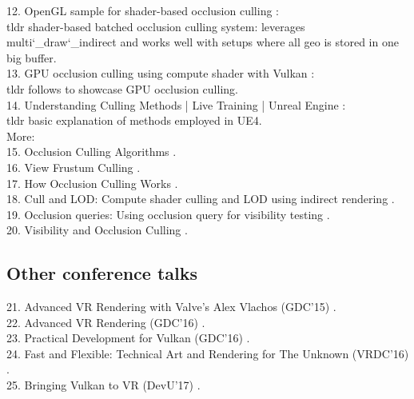 12. OpenGL sample for shader-based occlusion culling \cite{Kubisch.2014}: \\
tldr shader-based batched occlusion culling system: leverages multi\char`_draw\char`_indirect and works well with setups where all geo is stored in one big buffer.\\

13. GPU occlusion culling using compute shader with Vulkan \cite{sydneyzh.2018}: \\
tldr follows \cite{Anagnostou.2017} to showcase GPU occlusion culling.\\

14. Understanding Culling Methods | Live Training | Unreal Engine \cite{Hobson.2019}: \\
tldr basic explanation of methods employed in UE4.\\

More:\\
15. Occlusion Culling Algorithms \cite{Haines.1999}. \\
16. View Frustum Culling \cite{Lighthouse3d.com.2011}.\\
17. How Occlusion Culling Works \cite{thebennybox.2018}.\\
18. Cull and LOD: Compute shader culling and LOD using indirect rendering \cite{Willems.2016.6}.\\
19. Occlusion queries: Using occlusion query for visibility testing \cite{Willems.2016.4}.\\
20. Visibility and Occlusion Culling \cite{EpicGamesInc..n.d.}.\\

\subsection{Other conference talks}
21. Advanced \gls{VR} Rendering with Valve's Alex Vlachos (GDC'15) \cite{Vlachos.2016}.\\
22. Advanced \gls{VR} Rendering (GDC'16) \cite{Vlachos.2016b}.\\
23. Practical Development for Vulkan (GDC'16) \cite{Ginsburg.2016}.\\
24. Fast and Flexible: Technical Art and Rendering for The Unknown (VRDC'16) \cite{Answer.2016}.\\
25. Bringing Vulkan to \gls{VR} (DevU'17) \cite{Everitt.2017}.\\


